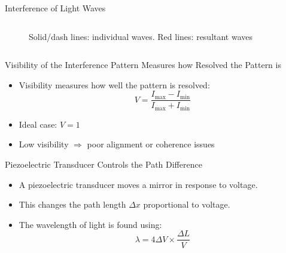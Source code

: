 \documentclass[aspectratio = 169]{beamer}
\begin{document}
\begin{frame}{Interference of Light Waves}
\begin{columns}
\begin{figure}

        \caption{Solid/dash lines: individual waves. Red lines: resultant waves}
    \end{figure}
\end{columns}
\end{frame}

\begin{frame}{Visibility of the Interference Pattern Measures how Resolved the Pattern is}
    \begin{itemize}
        \item Visibility measures how well the pattern is resolved:
        \[
        V = \frac{I_{\text{max}} - I_{\text{min}}}{I_{\text{max}} + I_{\text{min}}}
        \]
        \item Ideal case: $V = 1$
        \item Low visibility $\Rightarrow$ poor alignment or coherence issues
    \end{itemize}
\end{frame}

\begin{frame}{Piezoelectric Transducer Controls the Path Difference}
    \begin{itemize}
        \item A piezoelectric transducer moves a mirror in response to voltage.
        \item This changes the path length $\Delta x$ proportional to voltage.
        \item The wavelength of light is found using:
        \[
        \lambda = 4 \Delta V \times \frac{\Delta L}{V}
        \]
    \end{itemize}
\end{frame}

\end{document}
